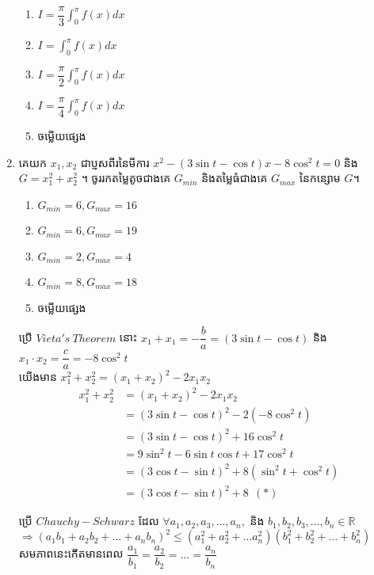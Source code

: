 \documentclass[12pt, a4paper]{article}
\begin{document}
\begin{enumerate}[m]
	\begin{enumerate}[k,4]
		\item $I=\dfrac{\pi}{3}\int_{0}^{\pi}f(x)dx$
		\item $I=\int_{0}^{\pi}f(x)dx$
		\item $I=\dfrac{\pi}{2}\int_{0}^{\pi}f(x)dx$
		\item $I=\dfrac{\pi}{4}\int_{0}^{\pi}f(x)dx$
		\item ចម្លើយផ្សេង
	\end{enumerate}
	\answer
	{\color{blue}\hrulefill}
	\item គេយក $x_1,x_2$ ជាប្ញសពីរនៃមីការ $x^2-\left(3\sin t-\cos t\right)x-8\cos^2t=0$ និង $G=x_1^2+x_2^2$ ។ ចូររកតម្លៃតូចជាងគេ $G_{min}$ និងតម្លៃធំជាងគេ $G_{max}$ នៃកន្សោម $G$។ 
	\begin{enumerate}[k,3]
		\item $G_{min}=6, G_{max}=16$
		\item $G_{min}=6, G_{max}=19$
		\item $G_{min}=2, G_{max}=4$
		\item $G_{min}=8, G_{max}=18$
		\item ចម្លើយផ្សេង
	\end{enumerate}
	\answer
	\begin{center}
		ប្រើ $Vieta's~Theorem$ នោះ $x_1+x_1=-\dfrac{b}{a}=\left(3\sin t-\cos t\right)$ \kb និង $x_1\cdot x_2=\dfrac{c}{a}=-8\cos^2t$ \\
		យើងមាន $x_1^2+x_2^2=\left(x_1+x_2\right)^2-2x_1 x_2$\\
		\begin{align*}
		x_1^2+x_2^2&=\left(x_1+x_2\right)^2-2x_1 x_2\\
		&=\left(3\sin t-\cos t\right)^2-2\left(-8\cos^2t\right)\\
		&=\left(3\sin t-\cos t\right)^2+16\cos^2t\\
		&=9\sin^2t-6\sin t\cos t +17\cos^2t\\
		&=\left(3\cos t-\sin t\right)^2 +8\left(\sin^2t+\cos^2t\right)\\
		&=\left(3\cos t-\sin t\right)^2 +8~~ (*)
		\end{align*}
		\begin{center}
			ប្រើ $Chauchy-Schwarz$ ដែល $\forall a_1,a_2, a_3,\dots,a_n,$ និង $b_1, b_2, b_3,\dots,b_n \in\mathbb{R}$\\
			$\Rightarrow\left(a_1b_1+a_2b_2+\dots+a_nb_n\right)^2\le\left(a_1^2+a_2^2+\dots a_n^2\right)\left(b_1^2+b_2^2+\dots +b_n^2\right)$\\
			សមភាពនេះកើតមានពេល $\dfrac{a_1}{b_1}=\dfrac{a_2}{b_2}=\dots=\dfrac{a_n}{b_n}$\\

\end{center}
\end{center}
\end{enumerate}
\end{document}
